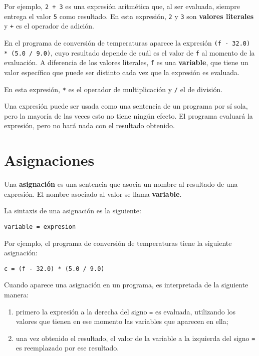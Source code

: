 Por ejemplo, \lstinline!2 + 3! es una expresión aritmética que, al ser
evaluada, siempre entrega el valor \lstinline!5! como resultado. En esta
expresión, \lstinline!2! y \lstinline!3! son \textbf{valores literales}
y \lstinline!+! es el operador de adición.

En el programa de conversión de temperaturas aparece la expresión
\lstinline!(f - 32.0) * (5.0 / 9.0)!, cuyo resultado depende de cuál es
el valor de \lstinline!f! al momento de la evaluación. A diferencia de
los valores literales, \lstinline!f! es una \textbf{variable}, que tiene
un valor específico que puede ser distinto cada vez que la expresión es
evaluada.

En esta expresión, \lstinline!*! es el operador de multiplicación y
\lstinline!/! el de división.

Una expresión puede ser usada como una sentencia de un programa por sí
sola, pero la mayoría de las veces esto no tiene ningún efecto. El
programa evaluará la expresión, pero no hará nada con el resultado
obtenido.

\section{Asignaciones}

Una \textbf{asignación} es una sentencia que asocia un nombre al
resultado de una expresión. El nombre asociado al valor se llama
\textbf{variable}.

La sintaxis de una asignación es la siguiente:

\begin{lstlisting}
variable = expresion
\end{lstlisting}

Por ejemplo, el programa de conversión de temperaturas tiene la
siguiente asignación:

\begin{lstlisting}
c = (f - 32.0) * (5.0 / 9.0)
\end{lstlisting}

Cuando aparece una asignación en un programa, es interpretada de la
siguiente manera:

\begin{enumerate}
\item
  primero la expresión a la derecha del signo \lstinline!=! es evaluada,
  utilizando los valores que tienen en ese momento las variables que
  aparecen en ella;
\item
  una vez obtenido el resultado, el valor de la variable a la izquierda
  del signo \lstinline!=! es reemplazado por ese resultado.
\end{enumerate}

